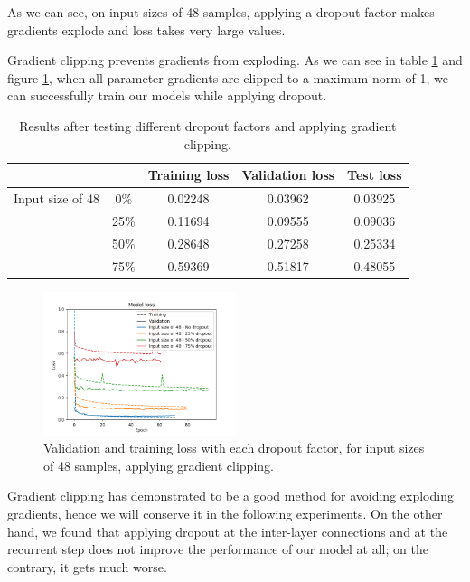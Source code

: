 \documentclass[]{article}
\begin{document}
As we can see, on input sizes of 48 samples, applying a dropout factor makes gradients explode and loss takes very large values.

Gradient clipping prevents gradients from exploding. As we can see in table \ref{t:drop2} and figure \ref{f:drop2}, when all parameter gradients are clipped to a maximum norm of 1, we can successfully train our models while applying dropout.

\begin{table}[H]
	\centering
	\begin{tabular}{@{}ccccc@{}}
		\toprule
		&      & Training loss & Validation loss & Test loss \\ \midrule
		Input size of 48 & 0\%  & 0.02248       & 0.03962         & 0.03925   \\
		& 25\% & 0.11694       & 0.09555         & 0.09036   \\
		& 50\% & 0.28648       & 0.27258         & 0.25334   \\
		& 75\% & 0.59369       & 0.51817         & 0.48055   \\ \bottomrule
	\end{tabular}
	\caption{Results after testing different dropout factors and applying gradient clipping.}
	\label{t:drop2}
\end{table}

\begin{figure}[H]
	\centering
	\includegraphics[width=0.5\textwidth]{drop2}
	\caption{Validation and training loss with each dropout factor, for input sizes of 48 samples, applying gradient clipping.}
	\label{f:drop2}
\end{figure}

Gradient clipping has demonstrated to be a good method for avoiding exploding gradients, hence we will conserve it in the following experiments. On the other hand, we found that applying dropout at the inter-layer connections and at the recurrent step does not improve the performance of our model at all; on the contrary, it gets much worse.
\end{document}

